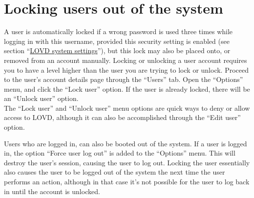 \documentclass[a4paper,oneside,openany,12pt]{memoir}
\renewenvironment{leftbar}[1][\hsize]
{%
    \def\FrameCommand
    {%
        {\color{LOVDdark}\vrule width 3pt \hspace{5pt}}%
        \colorbox{LOVDlight}%
    }%
    \MakeFramed{\hsize#1\advance\hsize-\width\FrameRestore}%
}
{\endMakeFramed}
\begin{document}
\section{Locking users out of the system}
A user is automatically locked if a wrong password is used three times while logging in with this username,
 provided this security setting is enabled (see section ``\hyperlink{s_system_settings}{LOVD system settings}''),
 but this lock may also be placed onto, or removed from an account manually.
Locking or unlocking a user account requires you to have a level higher than the user you are trying to lock or unlock.
Proceed to the user's account details page through the ``Users'' tab.
Open the ``Options'' menu, and click the ``Lock user'' option.
If the user is already locked, there will be an ``Unlock user'' option.
\\
The ``Lock user'' and ``Unlock user'' menu options are quick ways to deny or allow access to LOVD,
 although it can also be accomplished through the ``Edit user'' option.
\\
\par
Users who are logged in, can also be booted out of the system.
If a user is logged in, the option ``Force user log out'' is added to the ``Options'' menu.
This will destroy the user's session, causing the user to log out.
Locking the user essentially also causes the user to be logged out of the system the next time the user performs an action,
 although in that case it's not possible for the user to log back in until the account is unlocked.
\end{document}
